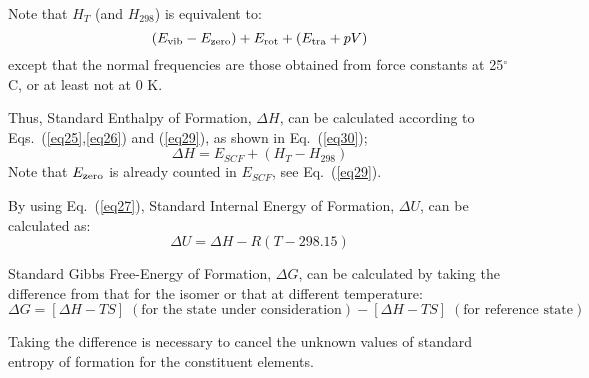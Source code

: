 Note that $H_T$ (and $H_{298}$) is equivalent to:
\begin{equation}
(E_{\rm vib} - E_{\rm zero}) + E_{\rm rot} + (E_{\rm tra} + pV) \nonumber\label{eq56}
\end{equation}
except that  the  normal  frequencies  are  those  obtained  from  force
constants at 25$^\circ$C, or at least not at 0 K.

Thus, Standard Enthalpy of Formation, $\Delta H$,  can  be  calculated
according to Eqs.~(\ref{eq25},\ref{eq26}) and (\ref{eq29}),
as shown in Eq.~(\ref{eq30});
\begin{equation}
\Delta H = E_{SCF} + (H_T - H_{298})   \nonumber\label{eq57}
\end{equation}
Note that $E_{\rm zero}$ is already counted in $E_{SCF}$,
see Eq.~(\ref{eq29}).

By using Eq.~(\ref{eq27}), Standard Internal Energy of Formation, $\Delta U$,
can be calculated as:
\begin{equation}
\Delta U = \Delta H - R(T - 298.15) \nonumber\label{eq58}
\end{equation}


Standard Gibbs Free-Energy of Formation, $\Delta G$, can be calculated
by  taking  the difference from that for the isomer or that at different
temperature:
\begin{equation}
\Delta G = [\Delta H - TS] \;(\mbox{for the state under consideration})
- [\Delta H - TS]\; (\mbox{for reference state})  \nonumber\label{eq59}
\end{equation}

Taking the difference is necessary  to  cancel  the  unknown  values  of
standard entropy of formation for the constituent elements.

